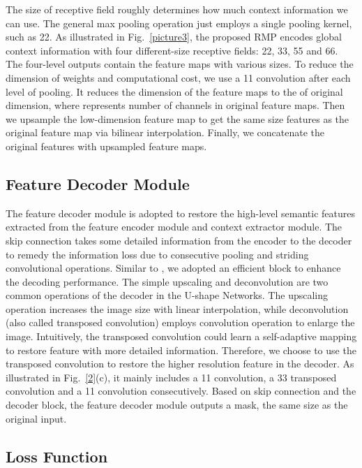 \documentclass[journal]{IEEEtran}
\begin{document}
The size of receptive field roughly determines how much context information we can use. The general max pooling operation just employs a single pooling kernel, such as 22. As illustrated in Fig.~\ref{picture3}, the proposed RMP encodes global context information with four different-size receptive fields: 22, 33, 55 and 66. The four-level outputs contain the feature maps with various sizes. To reduce the dimension of weights and computational cost, we use a 11 convolution after each level of pooling. It reduces the dimension of the feature maps to the  of original dimension, where  represents number of channels in original feature maps. Then we upsample the low-dimension feature map to get the same size features as the original feature map via bilinear interpolation. Finally, we concatenate the original features with upsampled feature maps.

\subsection{Feature Decoder Module}

The feature decoder module is adopted to restore the high-level semantic features extracted from the feature encoder module and context extractor module. The skip connection takes some detailed information from the encoder to the decoder to remedy the information loss due to consecutive pooling and striding convolutional operations. Similar to \cite{apostolopoulos2017pathological}, we adopted an efficient block to enhance the decoding performance. The simple upscaling and deconvolution are two common operations of the decoder in the U-shape Networks. The upscaling operation increases the image size with linear interpolation, while deconvolution (also called transposed convolution) employs convolution operation to enlarge the image. Intuitively, the transposed convolution could learn a self-adaptive mapping to restore feature with more detailed information. Therefore, we choose to use the transposed convolution to restore the higher resolution feature in the decoder. As illustrated in Fig.~\ref{2}(c), it mainly includes a 11 convolution, a 33 transposed convolution and a 11 convolution consecutively. Based on skip connection and the decoder block, the feature decoder module outputs a mask, the same size as the original input. 

\subsection{Loss Function}
\end{document}
